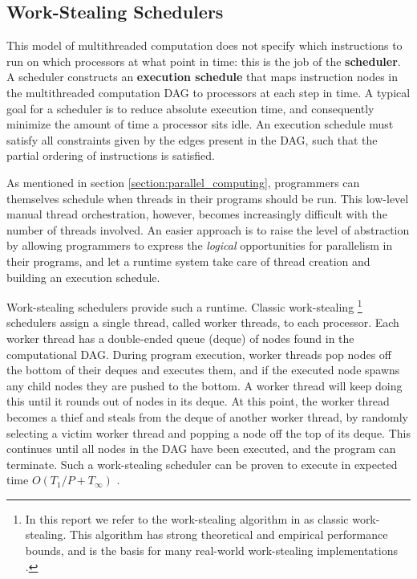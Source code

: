 \documentclass[bsc,frontabs,singlespacing,parskip,deptreport,normalheadings]{infthesis}
\begin{document}
\subsection{Work-Stealing Schedulers}
\label{subsection:work_stealing}

This model of multithreaded computation does not specify which instructions to
run on which processors at what point in time: this is the job of the
\textbf{scheduler}. A scheduler constructs an \textbf{execution schedule} that
maps instruction nodes in the multithreaded computation DAG to processors at
each step in time. A typical goal for a scheduler is to reduce absolute
execution time, and consequently minimize the amount of time a processor sits
idle. An execution schedule must satisfy all constraints given by the edges
present in the DAG, such that the partial ordering of instructions is satisfied.

As mentioned in section \ref{section:parallel_computing}, programmers can
themselves schedule when threads in their programs should be run. This
low-level manual thread orchestration, however, becomes increasingly difficult
with the number of threads involved. An easier approach is to raise the level of
abstraction by allowing programmers to express the \textit{logical}
opportunities for parallelism in their programs, and let a runtime system take
care of thread creation and building an execution schedule.

Work-stealing schedulers provide such a runtime. Classic work-stealing
\footnote{In this report we refer to the work-stealing algorithm in
    \cite{arora_thread_1998} as classic work-stealing. This algorithm has strong
    theoretical and empirical performance bounds, and is the basis for many
real-world work-stealing implementations \cite{frigo_implementation_1998}.}
schedulers assign a single thread, called worker threads, to each processor.
Each worker thread has a double-ended queue (deque) of nodes found in the
computational DAG. During program execution, worker threads pop nodes off the
bottom of their deques and executes them, and if the executed node spawns any
child nodes they are pushed to the bottom. A worker thread will keep doing this
until it rounds out of nodes in its deque. At this point, the worker thread
becomes a thief and steals from the deque of another worker thread, by randomly
selecting a victim worker thread and popping a node off the top of its deque.
This continues until all nodes in the DAG have been executed, and the program
can terminate. Such a work-stealing scheduler can be proven to execute in
expected time \(O(T_1 / P + T_\infty)\) \cite{arora_thread_1998}.
\end{document}
